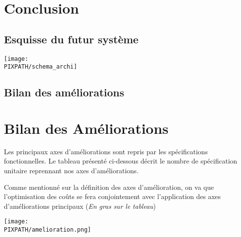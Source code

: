 \section{Conclusion}

\subsection{Esquisse du futur système}

\begin{center}
\texttt{[image: \\PIXPATH/schema\_archi]}
\end{center}

\subsection{Bilan des améliorations}

\section{Bilan des Améliorations}

Les principaux axes d'améliorations sont repris par les spécifications
fonctionnelles. Le tableau présenté ci-dessous décrit le nombre de
spécification unitaire reprennant nos axes d'améliorations. 

Comme mentionné sur la définition des axes d'amélioration, on va que
l'optimisation des coûts se fera conjointement avec l'application des axes
d'améliorations principaux (\textit{En gras sur le tableau})

\begin{center}
\texttt{[image: \\PIXPATH/amelioration.png]}
\end{center}



